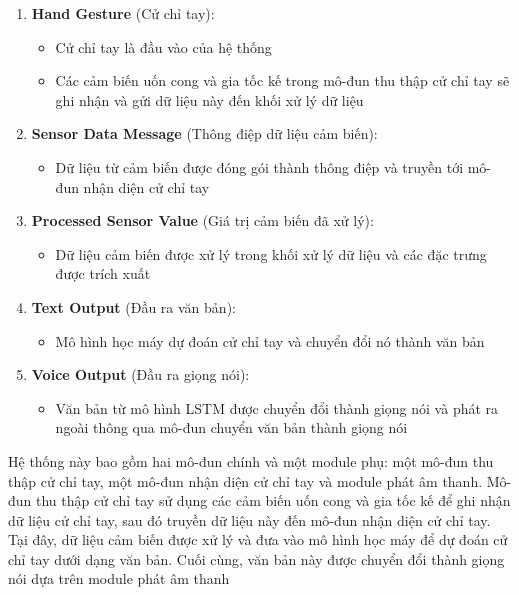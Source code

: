 \begin{enumerate}
    \item \textbf{Hand Gesture} (Cử chỉ tay):
    \begin{itemize}
        \item Cử chỉ tay là đầu vào của hệ thống
        \item Các cảm biến uốn cong và gia tốc kế trong mô-đun thu thập cử chỉ tay sẽ ghi nhận và gửi dữ liệu này đến khối xử lý dữ liệu
    \end{itemize}

    \item \textbf{Sensor Data Message} (Thông điệp dữ liệu cảm biến):
    \begin{itemize}
        \item Dữ liệu từ cảm biến được đóng gói thành thông điệp và truyền tới mô-đun nhận diện cử chỉ tay
    \end{itemize}

    \item \textbf{Processed Sensor Value} (Giá trị cảm biến đã xử lý):
    \begin{itemize}
        \item Dữ liệu cảm biến được xử lý trong khối xử lý dữ liệu và các đặc trưng được trích xuất
    \end{itemize}

    \item \textbf{Text Output} (Đầu ra văn bản):
    \begin{itemize}
        \item Mô hình học máy dự đoán cử chỉ tay và chuyển đổi nó thành văn bản
    \end{itemize}

    \item \textbf{Voice Output} (Đầu ra giọng nói):
    \begin{itemize}
        \item Văn bản từ mô hình LSTM được chuyển đổi thành giọng nói và phát ra ngoài thông qua mô-đun chuyển văn bản thành giọng nói
    \end{itemize}
\end{enumerate}


Hệ thống này bao gồm hai mô-đun chính và một module phụ: một mô-đun thu thập cử chỉ tay, một mô-đun nhận diện cử chỉ tay và module phát âm thanh. Mô-đun thu thập cử chỉ tay sử dụng các cảm biến uốn cong và gia tốc kế để ghi nhận dữ liệu cử chỉ tay, sau đó truyền dữ liệu này đến mô-đun nhận diện cử chỉ tay. Tại đây, dữ liệu cảm biến được xử lý và đưa vào mô hình học máy để dự đoán cử chỉ tay dưới dạng văn bản. Cuối cùng, văn bản này được chuyển đổi thành giọng nói dựa trên module phát âm thanh


